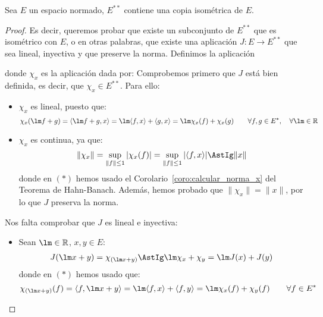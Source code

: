 \begin{prop}
    Sea $E$ un espacio normado, $E^{\ast\ast}$ contiene una copia isométrica de $E$.
    \begin{proof}
        Es decir, queremos probar que existe un subconjunto de $E^{\ast\ast}$ que es isométrico con $E$, o en otras palabras, que existe una aplicación $J:E\to E^{\ast\ast}$ que sea lineal, inyectiva y que preserve la norma. Definimos la aplicación

        donde $\chi_x$ es la aplicación dada por:
        Comprobemos primero que $J$ está bien definida, es decir, que $\chi_x\in E^{\ast\ast}$. Para ello:
        \begin{itemize}
            \item $\chi_x$ es lineal, puesto que:
                \begin{equation*}
                    \chi_x(\lm f + g) = \langle \lm f + g,x \rangle  = \lm\langle f,x \rangle  + \langle g,x \rangle  = \lm \chi_x(f) + \chi_x(g)\qquad \forall f,g\in E^\ast, \quad \forall \lm \in \mathbb{R}
                \end{equation*}
            \item $\chi_x$ es continua, ya que:
                \begin{equation*}
                    \|\chi_x\| = \sup_{\|f\|\leq 1}|\chi_x(f)| = \sup_{\|f\|\leq 1}|\langle f,x \rangle | \AstIg \|x\|
                \end{equation*}
                donde en $(\ast)$ hemos usado el Corolario~\ref{coro:calcular_norma_x} del Teorema de Hahn-Banach. Además, hemos probado que $\|\chi_x\| = \|x\|$, por lo que $J$ preserva la norma.
        \end{itemize}
        Nos falta comprobar que $J$ es lineal e inyectiva:
        \begin{itemize}
            \item Sean $\lm\in \mathbb{R}$, $x,y\in E$:
                \begin{align*}
                    J(\lm x + y) = \chi_{(\lm x + y)} \AstIg \lm \chi_x + \chi_y = \lm J(x) + J(y)
                \end{align*}
                donde en $(\ast)$ hemos usado que:
                \begin{equation*}
                    \chi_{(\lm x + y)}(f) = \langle f,\lm x + y \rangle  = \lm \langle f,x \rangle  + \langle f,y \rangle  = \lm \chi_x(f) + \chi_y(f) \qquad \forall f\in E^\ast

\end{equation*}
\end{itemize}
\end{proof}
\end{prop}
